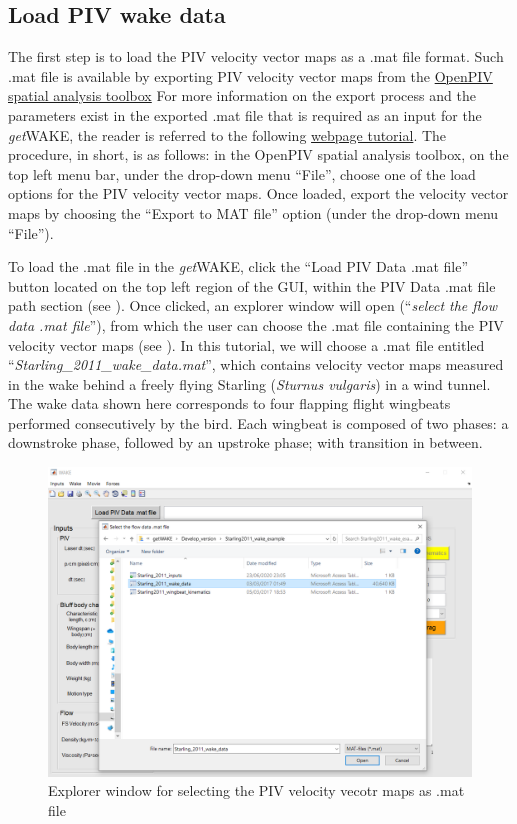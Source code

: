 \documentclass[12pt,a4paper]{article}
\begin{document}
\subsection{Load PIV wake data}

The first step is to load the PIV velocity vector maps as a .mat file format. 
Such .mat file is available by exporting PIV velocity vector maps from the \href{https://github.com/OpenPIV/openpiv-spatial-analysis-toolbox}{OpenPIV spatial analysis toolbox} 
For more information on the export process and the parameters exist in the exported .mat file that is required as an input for the \textit{get}WAKE, the reader is referred to the following \href{https://github.com/OpenPIV/openpiv-spatial-analysis-toolbox/blob/master/docs/tutorial.rst}{webpage tutorial}.
The procedure, in short, is as follows: in the OpenPIV spatial analysis toolbox, on the top left menu bar, under the drop-down menu ``File'', choose one of the load options for the PIV velocity vector maps. Once loaded, export the velocity vector maps by choosing the ``Export to MAT file'' option (under the drop-down menu ``File'').

To load the .mat file in the \textit{get}WAKE, click the ``Load PIV Data .mat file'' button located on the top left region of the GUI, within the PIV Data .mat file path section (see ). 
Once clicked, an explorer window will open (``\textit{select the flow data .mat file}''), from which the user can choose the .mat file containing the PIV velocity vector maps (see ). 
In this tutorial, we will choose a .mat file entitled ``\textit{Starling\_2011\_wake\_data.mat}'', which contains velocity vector maps measured in the wake behind a freely flying Starling (\textit{Sturnus vulgaris}) in a wind tunnel. 
The wake data shown here corresponds to four flapping flight wingbeats performed consecutively by the bird. 
Each wingbeat is composed of two phases: a downstroke phase, followed by an upstroke phase; with transition in between.

\begin{figure}[ht!]
	\centering
	\includegraphics[width=\textwidth]{explorer-window-wake-data}
	\caption{Explorer window for selecting the PIV velocity vecotr maps as .mat file}
	\label{fig:GUI-select_mat_file}
\end{figure}
\end{document}
